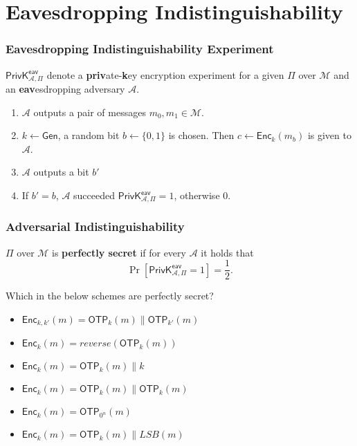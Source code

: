 \section{Eavesdropping Indistinguishability}
\begin{frame}\frametitle{Eavesdropping Indistinguishability Experiment}
$\mathsf{PrivK}^{\mathsf{eav}}_{\mathcal{A},\Pi}$ denote a \textbf{priv}ate-\textbf{k}ey encryption experiment for a given $\Pi$ over $\mathcal{M}$ and an \textbf{eav}esdropping adversary $\mathcal{A}$.
\begin{enumerate}
	\item $\mathcal{A}$ outputs a pair of messages $m_0, m_1 \in \mathcal{M}$.
	\item $k \gets \mathsf{Gen}$, a random bit $b \gets \{0,1\}$ is chosen. Then $c \gets \mathsf{Enc}_k(m_b)$ is given to $\mathcal{A}$.
	\item $\mathcal{A}$ outputs a bit $b'$
	\item If $b' = b$, $\mathcal{A}$ succeeded $\mathsf{PrivK}^{\mathsf{eav}}_{\mathcal{A},\Pi}=1$, otherwise 0.
\end{enumerate}
\begin{figure}
\begin{center}

\end{center}
\end{figure}
\end{frame}
\begin{frame}\frametitle{Adversarial Indistinguishability}
\begin{definition}
$\Pi$ over $\mathcal{M}$ is \textbf{perfectly secret} if for every $\mathcal{A}$ it holds that
\[ \Pr[\mathsf{PrivK}^{\mathsf{eav}}_{\mathcal{A},\Pi}=1] = \frac{1}{2}.\]
\end{definition}
\begin{exampleblock}{Which in the below schemes are perfectly secret?}
\begin{itemize}
\item $\mathsf{Enc}_{k,k'}(m)= \mathsf{OTP}_k(m) \parallel \mathsf{OTP}_{k'}(m)$
\item $\mathsf{Enc}_{k}(m)= reverse(\mathsf{OTP}_k(m))$
\item $\mathsf{Enc}_{k}(m)= \mathsf{OTP}_k(m) \parallel k$
\item $\mathsf{Enc}_{k}(m)= \mathsf{OTP}_k(m) \parallel \mathsf{OTP}_k(m) $
\item $\mathsf{Enc}_{k}(m)= \mathsf{OTP}_{0^{n}}(m)$
\item $\mathsf{Enc}_{k}(m)= \mathsf{OTP}_k(m) \parallel LSB(m)$
\end{itemize}
\end{exampleblock}
\end{frame}

